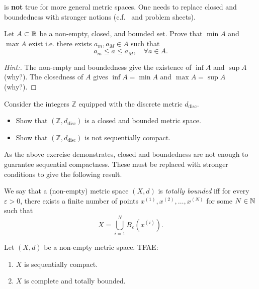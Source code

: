 \begin{rem}
	 is \textbf{not} true for more general metric spaces. One needs to replace closed and boundedness with stronger notions (c.f.~ and problem sheets).
\end{rem}
\begin{ex}
	\label{ex:r_closed_bdd}
	Let $A\subset \mathbb{R}$ be a non-empty, closed, and bounded set. Prove that $\min A$ and $\max A$ exist i.e. there exists $a_m,a_M\in A$ such that
	\[
	a_m \le a \le a_M,\quad \forall a\in A.
	\]
	\begin{proof}[Hint:]
		The non-empty and boundedness give the existence of $\inf A$ and $\sup A$ (why?). The closedness of $A$ gives $\inf A = \min A$ and $\max A = \sup A$ (why?).
	\end{proof}
\end{ex}
\begin{ex}
Consider the integers $\mathbb{Z}$ equipped with the discrete metric $d_\text{disc}$.
\begin{itemize}
	\item Show that $(\mathbb{Z},d_\text{disc})$ is a closed and bounded metric space.
	\item Show that $(\mathbb{Z},d_\text{disc})$ is not sequentially compact.
\end{itemize}
\end{ex}
As the above exercise demonstrates, closed and boundedness are not enough to guarantee sequential compactness. These must be replaced with stronger conditions to give the following result.
\begin{defn}
\label{defn:tot_bdd}
We say that a (non-empty) metric space $(X,d)$ is \textit{totally bounded} iff for every $\varepsilon>0$, there exists a finite number of points $x^{(1)},x^{(2)},\dots, x^{(N)}$ for some $N\in\mathbb{N}$ such that
\[
X = \bigcup_{i=1}^NB_\varepsilon(x^{(i)}).
\]
\end{defn}
\begin{thm}
\label{thm:hb_gen}
Let $(X,d)$ be a non-empty metric space. TFAE:
\begin{enumerate}
	\item \label{hb_1} $X$ is sequentially compact.
	\item \label{hb_2} $X$ is complete and totally bounded.
\end{enumerate}
\end{thm}

